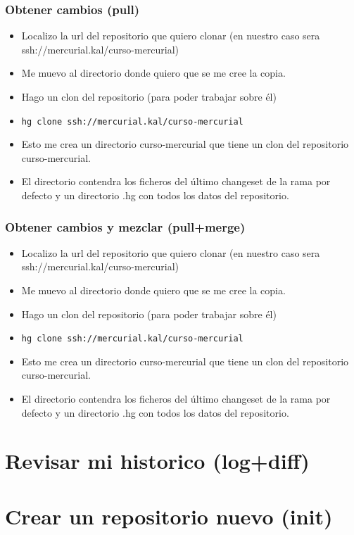\documentclass[10pt]{beamer}
\begin{document}
  \begin{frame}[containsverbatim]
    \frametitle{Obtener cambios (pull)}
    \begin{itemize}
      \item Localizo la url del repositorio que quiero clonar (en nuestro caso sera ssh://mercurial.kal/curso-mercurial)
      \item Me muevo al directorio donde quiero que se me cree la copia.
      \item Hago un clon del repositorio (para poder trabajar sobre él)
      \item \verb+hg clone ssh://mercurial.kal/curso-mercurial+
      \item Esto me crea un directorio curso-mercurial que tiene un clon del repositorio curso-mercurial.
      \item El directorio contendra los ficheros del último changeset de la rama por defecto y un directorio .hg con todos los datos del repositorio.
    \end{itemize}
  \end{frame}

  \begin{frame}[containsverbatim]
    \frametitle{Obtener cambios y mezclar (pull+merge)}
    \begin{itemize}
      \item Localizo la url del repositorio que quiero clonar (en nuestro caso sera ssh://mercurial.kal/curso-mercurial)
      \item Me muevo al directorio donde quiero que se me cree la copia.
      \item Hago un clon del repositorio (para poder trabajar sobre él)
      \item \verb+hg clone ssh://mercurial.kal/curso-mercurial+
      \item Esto me crea un directorio curso-mercurial que tiene un clon del repositorio curso-mercurial.
      \item El directorio contendra los ficheros del último changeset de la rama por defecto y un directorio .hg con todos los datos del repositorio.
    \end{itemize}
  \end{frame}

  \section*{Revisar mi historico (log+diff)}
  \section*{Crear un repositorio nuevo (init)}
\end{document}
